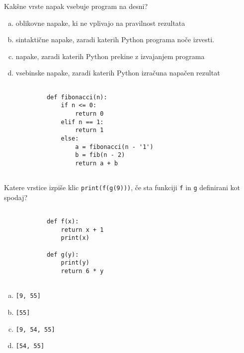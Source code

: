 \documentclass[arhiv, 10pt]{../izpit}
\newcommand{\inlinepy}[1]{\texttt{#1}}
\begin{document}
        \naloga*
        \begin{multicols}{2}
        \noindent
        Kakšne vrste napak vsebuje program na desni?

        \begin{enumerate}[(a)]
\item oblikovne napake, ki ne vplivajo na pravilnost rezultata
\item sintaktične napake, zaradi katerih Python programa noče izvesti.
\item napake, zaradi katerih Python prekine z izvajanjem programa
\item vsebinske napake, zaradi katerih Python izračuna napačen rezultat
\end{enumerate}

        \columnbreak

        \begin{verbatim}
        
            def fibonacci(n):
                if n <= 0:
                    return 0
                elif n == 1:
                    return 1
                else:
                    a = fibonacci(n - '1')
                    b = fib(n - 2)
                    return a + b
            
        \end{verbatim}

        \end{multicols}

    
        \naloga*
        Katere vrstice izpiše klic \inlinepy{print(f(g(9)))}, če sta funkciji \inlinepy{f} in \inlinepy{g} definirani kot spodaj?

        \begin{multicols}{2}
        \begin{verbatim}
        
            def f(x):
                return x + 1
                print(x)

            def g(y):
                print(y)
                return 6 * y
        
        \end{verbatim}

        \begin{enumerate}[(a)]
\item \inlinepy{[9, 55]}
\item \inlinepy{[55]}
\item \inlinepy{[9, 54, 55]}
\item \inlinepy{[54, 55]}
\end{enumerate}

        \end{multicols}
    
\end{document}
